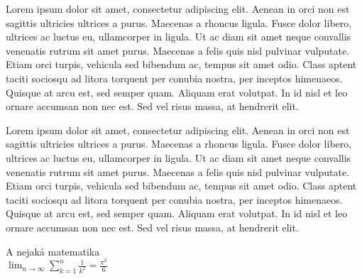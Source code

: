\documentclass[]{article}
\begin{document}
	Lorem ipsum dolor sit amet, consectetur adipiscing elit. Aenean in orci non est sagittis
	ultricies ultrices a purus. Maecenas a rhoncus ligula. Fusce dolor libero, ultrices ac
	luctus eu, ullamcorper in ligula. Ut ac diam sit amet neque convallis venenatis rutrum
	sit amet purus. Maecenas a felis quis nisl pulvinar vulputate. Etiam orci turpis, vehicula
	sed bibendum ac, tempus sit amet odio. Class aptent taciti sociosqu ad litora torquent per
	conubia nostra, per inceptos himenaeos. Quisque at arcu est, sed semper quam. Aliquam erat
	volutpat. In id nisl et leo ornare accumsan non nec est. Sed vel risus massa, at hendrerit
	elit.

	Lorem ipsum dolor sit amet, consectetur adipiscing elit. Aenean in orci non est sagittis
	ultricies ultrices a purus. Maecenas a rhoncus ligula. Fusce dolor libero, ultrices ac
	luctus eu, ullamcorper in ligula. Ut ac diam sit amet neque convallis venenatis rutrum
	sit amet purus. Maecenas a felis quis nisl pulvinar vulputate. Etiam orci turpis, vehicula
	sed bibendum ac, tempus sit amet odio. Class aptent taciti sociosqu ad litora torquent per
	conubia nostra, per inceptos himenaeos. Quisque at arcu est, sed semper quam. Aliquam erat
	volutpat. In id nisl et leo ornare accumsan non nec est. Sed vel risus massa, at hendrerit
	elit.
  
  \newpage
  
  A nejaká matematika \\
  
  $\lim_{n \to \infty}\sum_{k=1}^n \frac{1}{k^2} = \frac{\pi^2}{6}$
  
\end{document}

